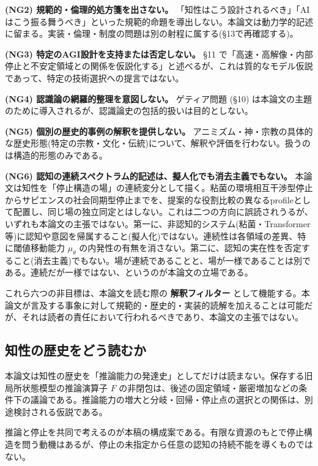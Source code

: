 \textbf{(NG2) 規範的・倫理的処方箋を出さない。}
「知性はこう設計されるべき」「AIはこう振る舞うべき」といった規範的命題を導出しない。本論文は動力学的記述に留まる。実装・倫理・制度の問題は別の射程に属する(\S{}13で再確認する)。

\textbf{(NG3) 特定のAGI設計を支持または否定しない。}
\S{}11 で「高速・高解像・内部停止と不安定領域との関係を仮説化する」と述べるが、これは質的なモデル仮説であって、特定の技術選択への提言ではない。

\textbf{(NG4) 認識論の網羅的整理を意図しない。}
ゲティア問題 (\S{}10) は本論文の主題のために導入されるが、認識論史の包括的扱いは目的としない。

\textbf{(NG5) 個別の歴史的事例の解釈を提供しない。}
アニミズム・神・宗教の具体的な歴史形態(特定の宗教・文化・伝統)について、解釈や評価を行わない。扱うのは構造的形態のみである。

\textbf{(NG6) 認知の連続スペクトラム的記述は、擬人化でも消去主義でもない。}
本論文は知性を「停止構造の場」の連続変分として描く。粘菌の環境相互干渉型停止からサピエンスの社会同期型停止までを、提案的な役割比較の異なるprofileとして配置し、同じ場の独立同定とはしない。これは二つの方向に誤読されうるが、いずれも本論文の主張ではない。第一に、非認知的システム(粘菌・Transformer 等)に認知や意図を帰属すること(擬人化)ではない。連続性は各領域の差異、特に閾値移動能力 $\mu_\theta$ の内発性の有無を消さない。第二に、認知の実在性を否定すること(消去主義)でもない。場が連続であることと、場が一様であることは別である。連続だが一様ではない、というのが本論文の立場である。

これら六つの非目標は、本論文を読む際の \textbf{解釈フィルター} として機能する。本論文が言及する事象に対して規範的・歴史的・実装的読解を加えることは可能だが、それは読者の責任において行われるべきであり、本論文の主張ではない。

\bigskip

\subsection{知性の歴史をどう読むか}

本論文は知性の歴史を「推論能力の発達史」としてだけは読まない。保存する旧局所状態模型の推論演算子 $F$ の非閉包は、後述の固定領域・厳密増加などの条件下の議論である。推論能力の増大と分岐・回帰・停止点の選択との関係は、別途検討される仮説である。

推論と停止を共同で考えるのが本稿の構成案である。有限な資源のもとで停止構造を問う動機はあるが、停止の未指定から任意の認知の持続不能を導くものではない。

